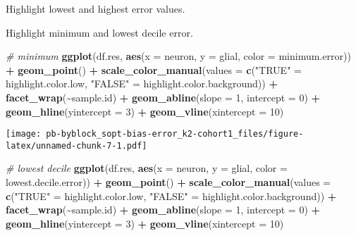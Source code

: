 \documentclass[
]{article}
\newenvironment{Shaded}{\begin{snugshade}}{\end{snugshade}}
\newcommand{\AttributeTok}[1]{\textcolor[rgb]{0.13,0.29,0.53}{#1}}
\newcommand{\CommentTok}[1]{\textcolor[rgb]{0.56,0.35,0.01}{\textit{#1}}}
\newcommand{\DecValTok}[1]{\textcolor[rgb]{0.00,0.00,0.81}{#1}}
\newcommand{\FunctionTok}[1]{\textcolor[rgb]{0.13,0.29,0.53}{\textbf{#1}}}
\newcommand{\NormalTok}[1]{#1}
\newcommand{\OtherTok}[1]{\textcolor[rgb]{0.56,0.35,0.01}{#1}}
\newcommand{\SpecialCharTok}[1]{\textcolor[rgb]{0.81,0.36,0.00}{\textbf{#1}}}
\newcommand{\StringTok}[1]{\textcolor[rgb]{0.31,0.60,0.02}{#1}}
\begin{document}
Highlight lowest and highest error values.

Highlight minimum and lowest decile error.

\begin{Shaded}
\begin{Highlighting}[]
\CommentTok{\# minimum}
\FunctionTok{ggplot}\NormalTok{(df.res, }\FunctionTok{aes}\NormalTok{(}\AttributeTok{x =}\NormalTok{ neuron, }\AttributeTok{y =}\NormalTok{ glial, }\AttributeTok{color =}\NormalTok{ minimum.error)) }\SpecialCharTok{+} 
  \FunctionTok{geom\_point}\NormalTok{() }\SpecialCharTok{+} \FunctionTok{scale\_color\_manual}\NormalTok{(}\AttributeTok{values =} \FunctionTok{c}\NormalTok{(}\StringTok{"TRUE"} \OtherTok{=}\NormalTok{ highlight.color.low, }\StringTok{"FALSE"} \OtherTok{=}\NormalTok{ highlight.color.background)) }\SpecialCharTok{+}
  \FunctionTok{facet\_wrap}\NormalTok{(}\SpecialCharTok{\textasciitilde{}}\NormalTok{sample.id) }\SpecialCharTok{+} 
  \FunctionTok{geom\_abline}\NormalTok{(}\AttributeTok{slope =} \DecValTok{1}\NormalTok{, }\AttributeTok{intercept =} \DecValTok{0}\NormalTok{) }\SpecialCharTok{+} \FunctionTok{geom\_hline}\NormalTok{(}\AttributeTok{yintercept =} \DecValTok{3}\NormalTok{) }\SpecialCharTok{+} \FunctionTok{geom\_vline}\NormalTok{(}\AttributeTok{xintercept =} \DecValTok{10}\NormalTok{)}
\end{Highlighting}
\end{Shaded}

\texttt{[image: pb-byblock\_sopt-bias-error\_k2-cohort1\_files/figure-latex/unnamed-chunk-7-1.pdf]}

\begin{Shaded}
\begin{Highlighting}[]
\CommentTok{\# lowest decile}
\FunctionTok{ggplot}\NormalTok{(df.res, }\FunctionTok{aes}\NormalTok{(}\AttributeTok{x =}\NormalTok{ neuron, }\AttributeTok{y =}\NormalTok{ glial, }\AttributeTok{color =}\NormalTok{ lowest.decile.error)) }\SpecialCharTok{+} 
  \FunctionTok{geom\_point}\NormalTok{() }\SpecialCharTok{+} \FunctionTok{scale\_color\_manual}\NormalTok{(}\AttributeTok{values =} \FunctionTok{c}\NormalTok{(}\StringTok{"TRUE"} \OtherTok{=}\NormalTok{ highlight.color.low, }\StringTok{"FALSE"} \OtherTok{=}\NormalTok{ highlight.color.background)) }\SpecialCharTok{+}
  \FunctionTok{facet\_wrap}\NormalTok{(}\SpecialCharTok{\textasciitilde{}}\NormalTok{sample.id) }\SpecialCharTok{+}
  \FunctionTok{geom\_abline}\NormalTok{(}\AttributeTok{slope =} \DecValTok{1}\NormalTok{, }\AttributeTok{intercept =} \DecValTok{0}\NormalTok{) }\SpecialCharTok{+} \FunctionTok{geom\_hline}\NormalTok{(}\AttributeTok{yintercept =} \DecValTok{3}\NormalTok{) }\SpecialCharTok{+} \FunctionTok{geom\_vline}\NormalTok{(}\AttributeTok{xintercept =} \DecValTok{10}\NormalTok{)}
\end{Highlighting}
\end{Shaded}
\end{document}
